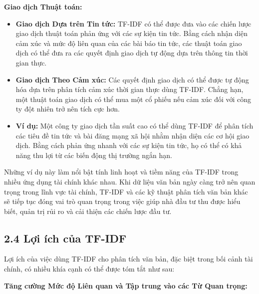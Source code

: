 \textbf{Giao dịch Thuật toán:}

\begin{itemize}
  \item \textbf{Giao dịch Dựa trên Tin tức:} TF-IDF có thể được đưa vào các chiến lược giao dịch thuật toán phản ứng với các sự kiện tin tức. Bằng cách nhận diện cảm xúc và mức độ liên quan của các bài báo tin tức, các thuật toán giao dịch có thể đưa ra các quyết định giao dịch tự động dựa trên thông tin thời gian thực.
  \item \textbf{Giao dịch Theo Cảm xúc:} Các quyết định giao dịch có thể được tự động hóa dựa trên phân tích cảm xúc thời gian thực dùng TF-IDF. Chẳng hạn, một thuật toán giao dịch có thể mua một cổ phiếu nếu cảm xúc đối với công ty đột nhiên trở nên tích cực hơn.
  \item \textbf{Ví dụ:} Một công ty giao dịch tần suất cao có thể dùng TF-IDF để phân tích các tiêu đề tin tức và bài đăng mạng xã hội nhằm nhận diện các cơ hội giao dịch. Bằng cách phản ứng nhanh với các sự kiện tin tức, họ có thể có khả năng thu lợi từ các biến động thị trường ngắn hạn.
\end{itemize}

Những ví dụ này làm nổi bật tính linh hoạt và tiềm năng của TF-IDF trong nhiều ứng dụng tài chính khác nhau. Khi dữ liệu văn bản ngày càng trở nên quan trọng trong lĩnh vực tài chính, TF-IDF và các kỹ thuật phân tích văn bản khác sẽ tiếp tục đóng vai trò quan trọng trong việc giúp nhà đầu tư thu được hiểu biết, quản trị rủi ro và cải thiện các chiến lược đầu tư.

\subsection{2.4 Lợi ích của TF-IDF}

Lợi ích của việc dùng TF-IDF cho phân tích văn bản, đặc biệt trong bối cảnh tài chính, có nhiều khía cạnh có thể được tóm tắt như sau:

\textbf{Tăng cường Mức độ Liên quan và Tập trung vào các Từ Quan trọng:}

